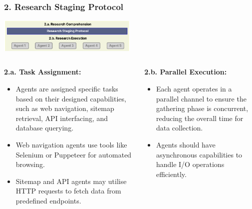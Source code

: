 \documentclass{beamer}
\begin{document}
\begin{frame}
\frametitle{2. Research Staging Protocol}
\vspace{-0.5cm} %
\begin{center}
    \includegraphics[width=0.5\textwidth]{MAD-stage-2.png}
\end{center}

\vspace{-0.3cm} %
\begin{columns}[T] %
    \begin{column}{0.5\textwidth}
        \small %
        \textbf{2.a. Task Assignment:}
        \begin{itemize}
            \item Agents are assigned specific tasks based on their designed capabilities, such as web navigation, sitemap retrieval, API interfacing, and database querying.
            \item Web navigation agents use tools like Selenium or Puppeteer for automated browsing.
            \item Sitemap and API agents may utilise HTTP requests to fetch data from predefined endpoints.
        \end{itemize}
     \end{column}
        
     \begin{column}{0.5\textwidth}
     \small
        \textbf{2.b. Parallel Execution:}
        \begin{itemize}
            \item Each agent operates in a parallel channel to ensure the gathering phase is concurrent, reducing the overall time for data collection.
            \item Agents should have asynchronous capabilities to handle I/O operations efficiently.
        \end{itemize}

    \end{column}
\end{columns}
\end{frame}
\end{document}
